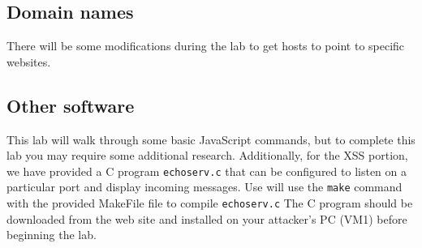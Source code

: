 \documentclass{article}
\begin{document}
\subsection{Domain names}
There will be some modifications during the lab to get hosts to point to specific websites.  


\subsection{Other software}
This lab will walk through some basic JavaScript commands, but to complete this lab you may require some additional research. 
Additionally, for the XSS portion, we have
provided a C program {\tt echoserv.c} that can be configured to listen on a particular
port and display incoming messages.  Use will use the {\tt make} command with the provided MakeFile file to compile  {\tt echoserv.c} 
The C program should be downloaded 
from the web site and installed on your attacker's PC (VM1) before beginning the lab.

\end{document}
